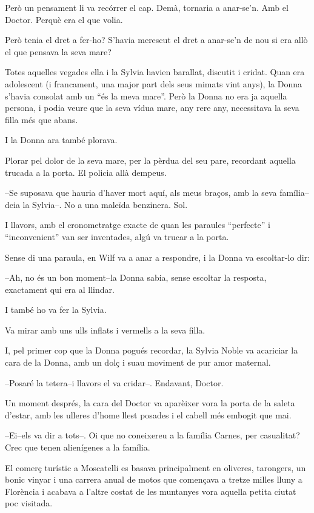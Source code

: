 Però un pensament li va recórrer el cap. Demà, tornaria a anar-se'n. Amb
el Doctor. Perquè era el que volia.

Però tenia el dret a fer-ho? S'havia merescut el dret a anar-se'n de nou
si era allò el que pensava la seva mare?

Totes aquelles vegades ella i la Sylvia havien barallat, discutit i
cridat. Quan era adolescent (i francament, una major part dels seus
mimats vint anys), la Donna s'havia consolat amb un ``és la meva mare''.
Però la Donna no era ja aquella persona, i podia veure que la seva vídua
mare, any rere any, necessitava la seva filla més que abans.

I la Donna ara també plorava.

Plorar pel dolor de la seva mare, per la pèrdua del seu pare, recordant
aquella trucada a la porta. El policia allà dempeus.

--Se suposava que hauria d'haver mort aquí, als meus braços, amb la seva
família--deia la Sylvia--. No a una maleïda benzinera. Sol.

I llavors, amb el cronometratge exacte de quan les paraules ``perfecte''
i ``inconvenient'' van ser inventades, algú va trucar a la porta.

Sense di una paraula, en Wilf va a anar a respondre, i la Donna va
escoltar-lo dir:

--Ah, no és un bon moment--la Donna sabia, sense escoltar la resposta,
exactament qui era al llindar.

I també ho va fer la Sylvia.

Va mirar amb uns ulls inflats i vermells a la seva filla.

I, pel primer cop que la Donna pogués recordar, la Sylvia Noble va
acariciar la cara de la Donna, amb un dolç i suau moviment de pur amor
maternal.

--Posaré la tetera--i llavors el va cridar--. Endavant, Doctor.

Un moment després, la cara del Doctor va aparèixer vora la porta de la
saleta d'estar, amb les ulleres d'home llest posades i el cabell més
embogit que mai.

--Ei--els va dir a tots--. Oi que no coneixereu a la família Carnes, per
casualitat? Crec que tenen alienígenes a la família.

El comerç turístic a Moscatelli es basava principalment en oliveres,
tarongers, un bonic vinyar i una carrera anual de motos que començava a
tretze milles lluny a Florència i acabava a l'altre costat de les
muntanyes vora aquella petita ciutat poc visitada.

